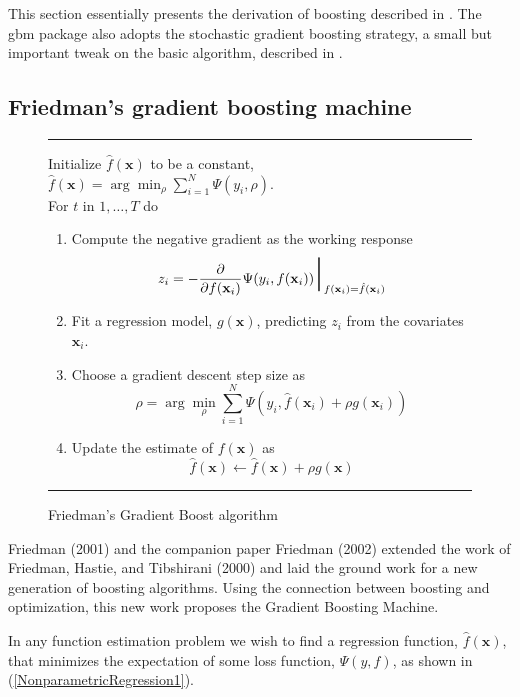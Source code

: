 \documentclass{article}
\newcommand{\aRule}{\begin{center} \rule{5in}{1mm} \end{center}}
\begin{document}
This section essentially presents the derivation of boosting described
in \cite{Friedman:2001}. The gbm package also adopts the stochastic
gradient boosting strategy, a small but important tweak on the basic
algorithm, described in \cite{Friedman:2002}.

\subsection{Friedman's gradient boosting machine} \label{sec:GradientBoostingMachine}

\begin{figure} 
  \aRule Initialize $\hat f(\mathbf{x})$ to be a constant, $\hat f(\mathbf{x}) = \arg \min_{\rho} \sum_{i=1}^N \Psi(y_i,\rho)$. \\
  For $t$ in $1,\ldots,T$ do
\begin{enumerate} 
\item Compute the negative gradient as the working response
    \begin{equation}
    z_i = -\frac{\partial}{\partial f(\mathbf{x}_i)} \Psi(y_i,f(\mathbf{x}_i)) \mbox{\Huge $|$}_{f(\mathbf{x}_i)=\hat f(\mathbf{x}_i)}
    \end{equation}
\item Fit a regression model, $g(\mathbf{x})$, predicting $z_i$ from the covariates $\mathbf{x}_i$. \item Choose a gradient descent step size as
    \begin{equation}
    \rho = \arg \min_{\rho} \sum_{i=1}^N \Psi(y_i,\hat f(\mathbf{x}_i)+\rho g(\mathbf{x}_i))
    \end{equation}
\item Update the estimate of $f(\mathbf{x})$ as
    \begin{equation}
    \hat f(\mathbf{x}) \leftarrow \hat f(\mathbf{x}) + \rho g(\mathbf{x})
    \end{equation}
\end{enumerate} \aRule \caption{Friedman's Gradient Boost algorithm} \label{fig:GradientBoost} \end{figure}

Friedman (2001) and the companion paper Friedman (2002) extended the
work of Friedman, Hastie, and Tibshirani (2000) and laid the ground
work for a new generation of boosting algorithms. Using the connection
between boosting and optimization, this new work proposes the Gradient
Boosting Machine.

In any function estimation problem we wish to find a regression
function, $\hat f(\mathbf{x})$, that minimizes the expectation of some
loss function, $\Psi(y,f)$, as shown in
(\ref{NonparametricRegression1}).
\end{document}
